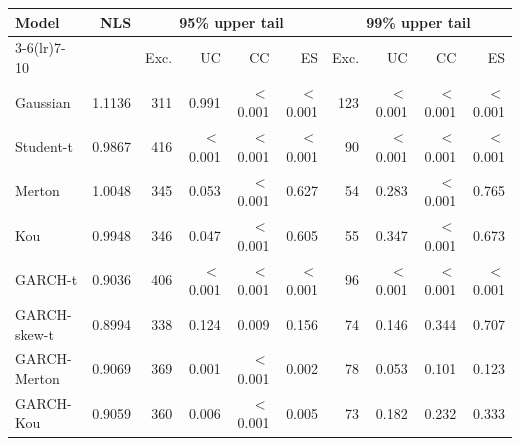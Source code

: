 \begin{tabular}{lrrrrrrrrr}
\toprule
Model & NLS & \multicolumn{4}{c}{95\% upper tail} & \multicolumn{4}{c}{99\% upper tail} \\\cmidrule(lr){3-6}\cmidrule(lr){7-10} & & Exc. & UC & CC & ES & Exc. & UC & CC & ES \\
\midrule
Gaussian & 1.1136 & 311 & 0.991 & $<$0.001 & $<$0.001 & 123 & $<$0.001 & $<$0.001 & $<$0.001 \\
Student-t & 0.9867 & 416 & $<$0.001 & $<$0.001 & $<$0.001 & 90 & $<$0.001 & $<$0.001 & $<$0.001 \\
Merton & 1.0048 & 345 & 0.053 & $<$0.001 & 0.627 & 54 & 0.283 & $<$0.001 & 0.765 \\
Kou & 0.9948 & 346 & 0.047 & $<$0.001 & 0.605 & 55 & 0.347 & $<$0.001 & 0.673 \\
GARCH-t & 0.9036 & 406 & $<$0.001 & $<$0.001 & $<$0.001 & 96 & $<$0.001 & $<$0.001 & $<$0.001 \\
GARCH-skew-t & 0.8994 & 338 & 0.124 & 0.009 & 0.156 & 74 & 0.146 & 0.344 & 0.707 \\
GARCH-Merton & 0.9069 & 369 & 0.001 & $<$0.001 & 0.002 & 78 & 0.053 & 0.101 & 0.123 \\
GARCH-Kou & 0.9059 & 360 & 0.006 & $<$0.001 & 0.005 & 73 & 0.182 & 0.232 & 0.333 \\
\bottomrule
\end{tabular}
